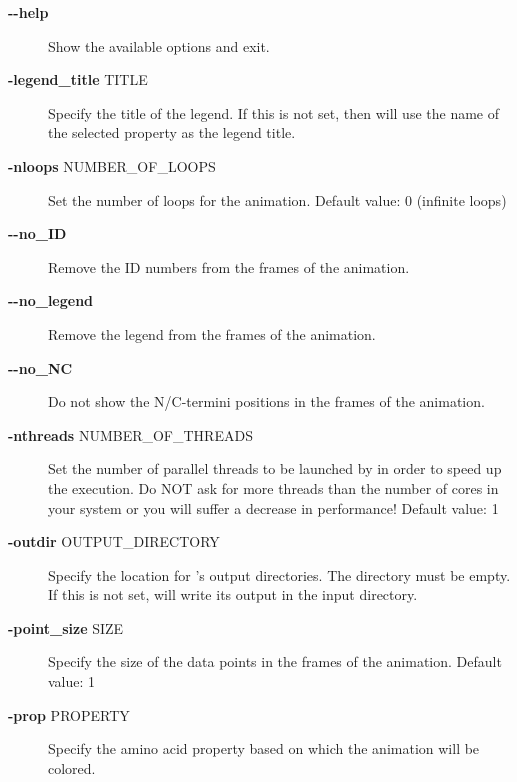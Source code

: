 \documentclass[12pt,a4paper]{article}
\begin{document}
\begin{description}
\item[{\textbf{-{}-help}}] \mbox{}

Show the available options and exit.

\item[{\textbf{-legend\_title} TITLE}] \mbox{}

Specify the title of the legend. If this is not set, then  will use the name of the selected property as the legend title.

\item[{\textbf{-nloops} NUMBER\_OF\_LOOPS}] \mbox{}

Set the number of loops for the animation. Default value: 0 (infinite loops)

\item[{\textbf{-{}-no\_ID}}] \mbox{}

Remove the ID numbers from the frames of the animation.

\item[{\textbf{-{}-no\_legend}}] \mbox{}

Remove the legend from the frames of the animation.

\item[{\textbf{-{}-no\_NC}}] \mbox{}

Do not show the N/C-termini positions in the frames of the animation.

\item[{\textbf{-nthreads} NUMBER\_OF\_THREADS}] \mbox{}

Set the number of parallel threads to be launched by  in order to speed up the execution. Do NOT ask for more threads than the number of cores in your system or you will suffer a decrease in performance! Default value: 1

\item[{\textbf{-outdir} OUTPUT\_DIRECTORY}] \mbox{}

Specify the location for 's output directories. The directory must be empty. If this is not set,  will write its output in the input directory.

\item[{\textbf{-point\_size} SIZE}] \mbox{}

Specify the size of the data points in the frames of the animation. Default value: 1

\item[{\textbf{-prop} PROPERTY}] \mbox{}

Specify the amino acid property based on which the animation will be colored.


\end{description}
\end{document}
